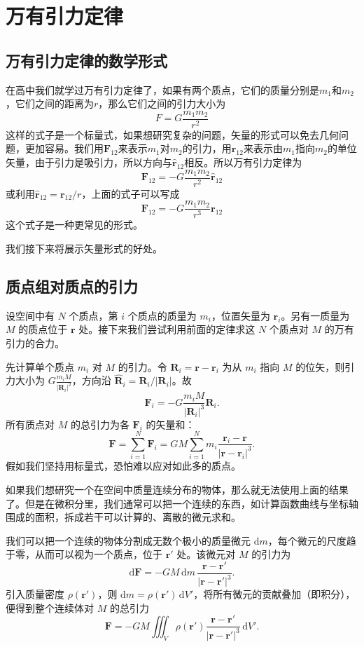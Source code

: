 \section{万有引力定律}
\subsection{万有引力定律的数学形式}
在高中我们就学过万有引力定律了，如果有两个质点，它们的质量分别是$m_1$和$m_2$，它们之间的距离为$r$，那么它们之间的引力大小为
\[
F = G \frac{m_1 m_2}{r^2}
\]
这样的式子是一个标量式，如果想研究复杂的问题，矢量的形式可以免去几何问题，更加容易。我们用$\mathbf{F}_{12}$来表示$m_1$对$m_2$的引力，用$\hat{\mathbf{r}}_{12}$来表示由$m_1$指向$m_2$的单位矢量，由于引力是吸引力，所以方向与$\hat{\mathbf{r}}_{12}$相反。所以万有引力定律为
\[
\mathbf{F}_{12} = -G \frac{m_1 m_2}{r^2} \hat{\mathbf{r}}_{12}
\]
或利用$\hat{\mathbf{r}}_{12}= \mathbf{r}_{12}/r$，上面的式子可以写成
\[
\mathbf{F}_{12} = -G \frac{m_1 m_2}{r^3} \mathbf{r}_{12}
\]
这个式子是一种更常见的形式。

我们接下来将展示矢量形式的好处。
\subsection{质点组对质点的引力}
设空间中有 $N$ 个质点，第 $i$ 个质点的质量为 $m_i$，位置矢量为 $\mathbf{r}_i$。另有一质量为 $M$ 的质点位于 $\mathbf{r}$ 处。接下来我们尝试利用前面的定律求这 $N$ 个质点对 $M$ 的万有引力的合力。

先计算单个质点 $m_i$ 对 $M$ 的引力。令 $\mathbf{R}_{i} = \mathbf{r} - \mathbf{r}_i$ 为从 $m_i$ 指向 $M$ 的位矢，则引力大小为 $G \frac{m_i M}{|\mathbf{R}_{i}|^2}$，方向沿 $\hat{\mathbf{R}}_i = \mathbf{R}_i / |\mathbf{R}_i|$。故
\[
\mathbf{F}_i = -G \frac{m_i M}{|\mathbf{R}_i|^3} \mathbf{R}_i.
\]
所有质点对 $M$ 的总引力为各 $\mathbf{F}_i$ 的矢量和：
\[
\mathbf{F} = \sum_{i=1}^{N} \mathbf{F}_i = G M \sum_{i=1}^{N} m_i \frac{\mathbf{r}_i - \mathbf{r}}{|\mathbf{r} - \mathbf{r}_i|^3}.
\]
假如我们坚持用标量式，恐怕难以应对如此多的质点。

如果我们想研究一个在空间中质量连续分布的物体，那么就无法使用上面的结果了。但是在微积分里，我们通常可以把一个连续的东西，如计算函数曲线与坐标轴围成的面积，拆成若干可以计算的、离散的微元求和。

我们可以把一个连续的物体分割成无数个极小的质量微元 $\mathrm{d}m$，每个微元的尺度趋于零，从而可以视为一个质点，位于 $\mathbf{r}'$ 处。该微元对 $M$ 的引力为
\[
\mathrm{d}\mathbf{F} = -G M \, \mathrm{d}m \, \frac{\mathbf{r} - \mathbf{r}'}{|\mathbf{r} - \mathbf{r}'|^3}.
\]
引入质量密度 $\rho(\mathbf{r}')$，则 $\mathrm{d}m = \rho(\mathbf{r}') \, \mathrm{d}V'$，将所有微元的贡献叠加（即积分），便得到整个连续体对 $M$ 的总引力
\[
\mathbf{F} = -G M \iiint_V \rho(\mathbf{r}') \frac{\mathbf{r} - \mathbf{r}'}{|\mathbf{r} - \mathbf{r}'|^3} \, \mathrm{d}V'.
\]
